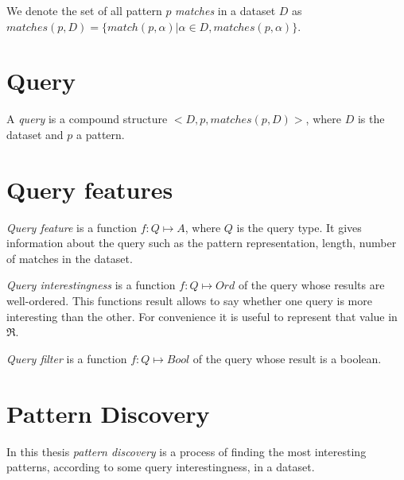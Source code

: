 We denote the set of all pattern $p$ \emph{matches} in a dataset 
$D$ as $matches(p, D) = \{ match(p, \alpha) | \alpha \in D, matches(p, \alpha) \}$.

\section{Query}

A \emph{query} is a compound structure $<D, p, matches(p, D)>$, 
where $D$ is the dataset and $p$ a pattern.

\section{Query features}

\emph{Query feature} is a function $f: Q \mapsto A$, 
where $Q$ is the query type. It gives information about 
the query such as the pattern representation, 
length, number of matches in the dataset.

\emph{Query interestingness} is a function $f: Q \mapsto Ord$ 
of the query whose results are well-ordered. This functions result allows to
say whether one query is more interesting than the other.
For convenience it is useful to represent that value in
$\Re$.

\emph{Query filter} is a function $f: Q \mapsto Bool$ of the query whose result
is a boolean.

\section{Pattern Discovery}

In this thesis \emph{pattern discovery} is a process of finding 
the most interesting patterns, according to some query interestingness,
in a dataset.
